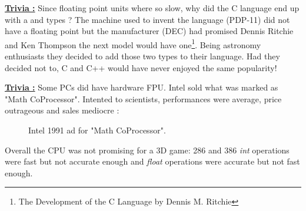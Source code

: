 \documentclass[book.tex]{subfiles}
\begin{document}
  \bigskip

 \textbf{\underline{Trivia :}} Since floating point units where so slow, why did the C language end up with a  and  types ? The machine used to invent the language (PDP-11) did not have a floating point but the manufacturer (DEC) had promised Dennis Ritchie and Ken Thompson the next model would have one\footnote{The Development of the C Language by Dennis M. Ritchie}. Being astronomy enthusiasts they decided to add those two types to their language. Had they decided not to, C and C++ would have never enjoyed the same popularity!

\bigskip  
\break
\textbf{\underline{Trivia :}} Some PCs did have hardware FPU. Intel sold what was marked as "Math CoProcessor". Intented to scientists, performances were average, price outrageous and sales mediocre :\\
\begin{figure}[H]
\centering
\caption{Intel 1991 ad for "Math CoProcessor".}
\label{fig:fp_internals}
\end{figure}



\bigskip
Overall the CPU was not promising for a 3D game: 286 and 386 \emph{int} operations were fast but not accurate enough and \emph{float} operations were accurate but not fast enough.
   
\end{document}
